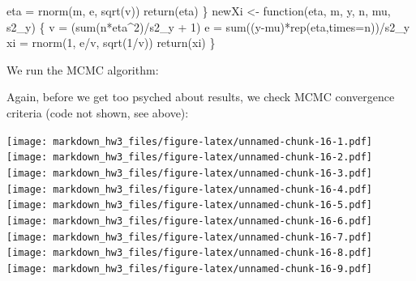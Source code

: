 \documentclass[]{article}
\newenvironment{Shaded}{\begin{snugshade}}{\end{snugshade}}
\newcommand{\KeywordTok}[1]{\textcolor[rgb]{0.94,0.87,0.69}{{#1}}}
\newcommand{\DataTypeTok}[1]{\textcolor[rgb]{0.87,0.87,0.75}{{#1}}}
\newcommand{\DecValTok}[1]{\textcolor[rgb]{0.86,0.86,0.80}{{#1}}}
\newcommand{\StringTok}[1]{\textcolor[rgb]{0.80,0.58,0.58}{{#1}}}
\newcommand{\CommentTok}[1]{\textcolor[rgb]{0.50,0.62,0.50}{{#1}}}
\newcommand{\NormalTok}[1]{\textcolor[rgb]{0.80,0.80,0.80}{{#1}}}
\begin{document}
\begin{Shaded}
\begin{Highlighting}[]
  \NormalTok{eta =}\StringTok{ }\KeywordTok{rnorm}\NormalTok{(m, e, }\KeywordTok{sqrt}\NormalTok{(v))}
  \KeywordTok{return}\NormalTok{(eta)}
\NormalTok{\}}
\NormalTok{newXi <-}\StringTok{ }\NormalTok{function(eta, m, y, n, mu, s2_y)}
\NormalTok{\{}
  \NormalTok{v =}\StringTok{ }\NormalTok{(}\KeywordTok{sum}\NormalTok{(n*eta^}\DecValTok{2}\NormalTok{)/s2_y +}\StringTok{ }\DecValTok{1}\NormalTok{)}
  \NormalTok{e =}\StringTok{ }\KeywordTok{sum}\NormalTok{((y-mu)*}\KeywordTok{rep}\NormalTok{(eta,}\DataTypeTok{times=}\NormalTok{n))/s2_y}
  \NormalTok{xi =}\StringTok{ }\KeywordTok{rnorm}\NormalTok{(}\DecValTok{1}\NormalTok{, e/v, }\KeywordTok{sqrt}\NormalTok{(}\DecValTok{1}\NormalTok{/v))}
  \KeywordTok{return}\NormalTok{(xi)}
\NormalTok{\}}
\end{Highlighting}
\end{Shaded}

We run the MCMC algorithm:

\begin{Shaded}
\end{Shaded}

Again, before we get too psyched about results, we check MCMC
convergence criteria (code not shown, see above):

\texttt{[image: markdown\_hw3\_files/figure-latex/unnamed-chunk-16-1.pdf]}
\texttt{[image: markdown\_hw3\_files/figure-latex/unnamed-chunk-16-2.pdf]}
\texttt{[image: markdown\_hw3\_files/figure-latex/unnamed-chunk-16-3.pdf]}
\texttt{[image: markdown\_hw3\_files/figure-latex/unnamed-chunk-16-4.pdf]}
\texttt{[image: markdown\_hw3\_files/figure-latex/unnamed-chunk-16-5.pdf]}
\texttt{[image: markdown\_hw3\_files/figure-latex/unnamed-chunk-16-6.pdf]}
\texttt{[image: markdown\_hw3\_files/figure-latex/unnamed-chunk-16-7.pdf]}
\texttt{[image: markdown\_hw3\_files/figure-latex/unnamed-chunk-16-8.pdf]}
\texttt{[image: markdown\_hw3\_files/figure-latex/unnamed-chunk-16-9.pdf]}
\end{document}
